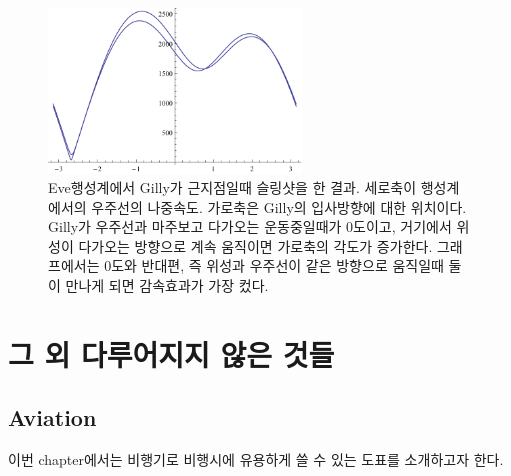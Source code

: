 \documentclass[9pt,twoside,openany]{amsbook}
\begin{document}
\begin{figure}
\caption{Eve행성계에서 Gilly가 근지점일때 슬링샷을 한 결과. 세로축이 행성계에서의 우주선의 나중속도. 가로축은 Gilly의 입사방향에 대한 위치이다. Gilly가 우주선과 마주보고 다가오는 운동중일때가 0도이고, 거기에서 위성이 다가오는 방향으로 계속 움직이면 가로축의 각도가 증가한다. 그래프에서는 0도와 반대편, 즉 위성과 우주선이 같은 방향으로 움직일때 둘이 만나게 되면 감속효과가 가장 컸다.}
\label{fig:sling-slow}
\includegraphics[width=0.6\textwidth]{sling-slow.pdf}
\end{figure}


\part{그 외 다루어지지 않은 것들}
\chapter{Aviation}
이번 chapter에서는 비행기로 비행시에 유용하게 쓸 수 있는 도표를 소개하고자 한다.
\end{document}
